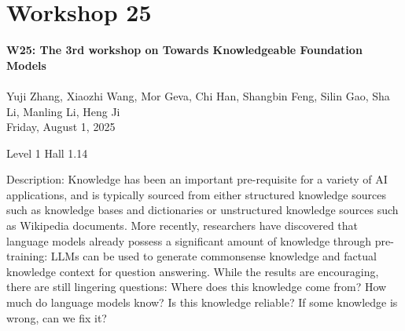 \clearpage


\section[W25: The 3rd workshop on Towards Knowledgeable Foundation Models]{Workshop 25}
\label{workshop_25}

\begin{center}
    {\Large \textbf{W25: The 3rd workshop on Towards Knowledgeable Foundation Models}}\\
\\

Yuji Zhang, Xiaozhi Wang, Mor Geva, Chi Han, Shangbin Feng, Silin Gao, Sha Li, Manling Li, Heng Ji\\

    Friday, August 1, 2025

 Level 1 Hall 1.14
    
\end{center}

Description: Knowledge has been an important pre-requisite for a variety of AI applications, and is typically sourced from either structured knowledge sources such as knowledge bases and dictionaries or unstructured knowledge sources such as Wikipedia documents. More recently, researchers have discovered that language models already possess a significant amount of knowledge through pre-training: LLMs can be used to generate commonsense knowledge and factual knowledge context for question answering. While the results are encouraging, there are still lingering questions: Where does this knowledge come from? How much do language models know? Is this knowledge reliable? If some knowledge is wrong, can we fix it?

